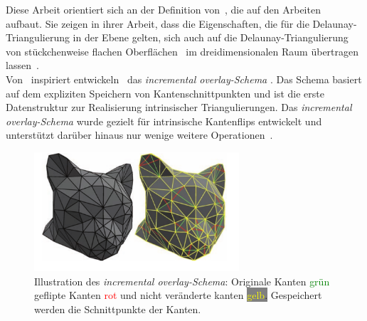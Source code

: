 Diese Arbeit orientiert sich an der Definition von~\citet{Bobenko:2007:LaplaceBeltrami}, die auf den Arbeiten~\cite{boris1934delaunay,indermitte:2001:voronoi,lambert:1994:delaunay} aufbaut. Sie zeigen in ihrer Arbeit, dass die Eigenschaften, die für die Delaunay-Triangulierung in der Ebene gelten, sich auch auf die Delaunay-Triangulierung  von stückchenweise flachen Oberflächen~\cite[Definiton 1] {Bobenko:2007:LaplaceBeltrami}  im dreidimensionalen Raum übertragen lassen~\cite[Definition 3]{Bobenko:2007:LaplaceBeltrami}.\\

Von~\citet{Bobenko:2007:LaplaceBeltrami} inspiriert entwickeln~\citet{Bobenko:2006:SIGGRAPH} das \textit{incremental overlay-Schema} \cite[Abschnitt 2.3]{Bobenko:2006:SIGGRAPH}. Das Schema basiert auf dem expliziten Speichern von Kantenschnittpunkten und ist die erste Datenstruktur zur Realisierung intrinsischer Triangulierungen. Das \textit{incremental overlay-Schema} wurde gezielt für intrinsische Kantenflips entwickelt und unterstützt darüber hinaus nur wenige weitere Operationen~\cite[Abschnitt 2]{Sharp:2019:NIT}. \\
\begin{figure}[ht]%
    \centering
  \includegraphics[width=3in]{images/overlaySchema.png}
  \caption{Illustration des \textit{incremental overlay-Schema}:  Originale Kanten \textcolor{green}{grün} geflipte Kanten \textcolor{red}{rot} und nicht veränderte kanten \colorbox{gray}{\textcolor{yellow}{gelb}.} Gespeichert werden die Schnittpunkte der Kanten.  \cite{Bobenko:2006:SIGGRAPH}}
\end{figure}
    
